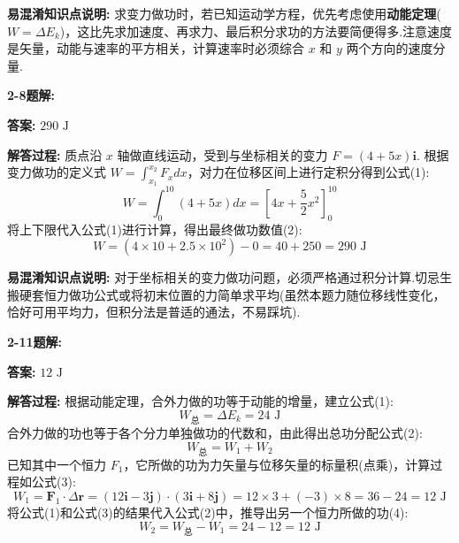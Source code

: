 \textbf{易混淆知识点说明:}
求变力做功时，若已知运动学方程，优先考虑使用\textbf{动能定理}($W = \Delta E_k$)，这比先求加速度、再求力、最后积分求功的方法要简便得多.注意速度是矢量，动能与速率的平方相关，计算速率时必须综合 $x$ 和 $y$ 两个方向的速度分量.

\vspace{2em}

\textbf{2-8题解:}

\textbf{答案:} $290\text{ J}$

\textbf{解答过程:}
质点沿 $x$ 轴做直线运动，受到与坐标相关的变力 $F = (4 + 5x)\mathbf{i}$.
根据变力做功的定义式 $W = \int_{x_1}^{x_2} F_x dx$，对力在位移区间上进行定积分得到公式(1):
\begin{equation}
	W = \int_{0}^{10} (4 + 5x) dx = \left[ 4x + \frac{5}{2}x^2 \right]_{0}^{10}
\end{equation}
将上下限代入公式(1)进行计算，得出最终做功数值(2):
\begin{equation}
	W = \left(4 \times 10 + 2.5 \times 10^2\right) - 0 = 40 + 250 = 290\text{ J}
\end{equation}

\textbf{易混淆知识点说明:}
对于坐标相关的变力做功问题，必须严格通过积分计算.切忌生搬硬套恒力做功公式或将初末位置的力简单求平均(虽然本题力随位移线性变化，恰好可用平均力，但积分法是普适的通法，不易踩坑).

\vspace{2em}

\textbf{2-11题解:}


\textbf{答案:} $12\text{ J}$

\textbf{解答过程:}
根据动能定理，合外力做的功等于动能的增量，建立公式(1):
\begin{equation}
	W_{\text{总}} = \Delta E_k = 24\text{ J}
\end{equation}
合外力做的功也等于各个分力单独做功的代数和，由此得出总功分配公式(2):
\begin{equation}
	W_{\text{总}} = W_1 + W_2
\end{equation}
已知其中一个恒力 $F_1$，它所做的功为力矢量与位移矢量的标量积(点乘)，计算过程如公式(3):
\begin{equation}
	W_1 = \mathbf{F}_1 \cdot \Delta\mathbf{r} = (12\mathbf{i} - 3\mathbf{j}) \cdot (3\mathbf{i} + 8\mathbf{j}) = 12 \times 3 + (-3) \times 8 = 36 - 24 = 12\text{ J}
\end{equation}
将公式(1)和公式(3)的结果代入公式(2)中，推导出另一个恒力所做的功(4):
\begin{equation}
	W_2 = W_{\text{总}} - W_1 = 24 - 12 = 12\text{ J}
\end{equation}

